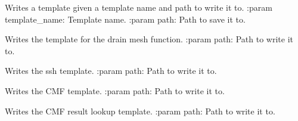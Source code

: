\documentclass[letterpaper,10pt,english]{sphinxmanual}
\begin{document}
\begin{fulllineitems}
\label{\detokenize{lib:livestock.lib.templates.pick_template}}
Writes a template given a template name and path to write it to.
:param template\_name: Template name.
:param path: Path to save it to.

\end{fulllineitems}


\begin{fulllineitems}
\label{\detokenize{lib:livestock.lib.templates.drain_mesh_template}}
Writes the template for the drain mesh function.
:param path: Path to write it to.

\end{fulllineitems}


\begin{fulllineitems}
\label{\detokenize{lib:livestock.lib.templates.ssh_template}}
Writes the ssh template.
:param path: Path to write it to.

\end{fulllineitems}


\begin{fulllineitems}
\label{\detokenize{lib:livestock.lib.templates.cmf_template}}
Writes the CMF template.
:param path: Path to write it to.

\end{fulllineitems}


\begin{fulllineitems}
\label{\detokenize{lib:livestock.lib.templates.process_cmf_results}}
Writes the CMF result lookup template.
:param path: Path to write it to.

\end{fulllineitems}
\end{document}
